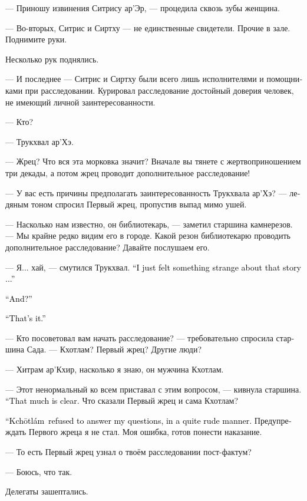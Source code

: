 \documentclass[a4paper,12pt,fleqn]{book}\usepackage{cooltooltips}\usepackage{polyglossia}\setdefaultlanguage{russian}\setotherlanguage{english}\defaultfontfeatures{Ligatures=TeX,Mapping=tex-text} \usepackage{xcolor}\definecolor{lightgray}{HTML}{bbbbbb}\color{lightgray}\newcommand{\ml}[3]{\textenglish{\textcolor{black}{#3}}}
\newcommand{\Kchotlam}{Kch\={o}tl\'{a}m}
\begin{document}
--- Приношу извинения Ситрису ар'Эр, --- процедила сквозь зубы женщина.

--- Во-вторых, Ситрис и Сиртху --- не единственные свидетели.
Прочие в зале.
Поднимите руки.

Несколько рук поднялись.

--- И последнее --- Ситрис и Сиртху были всего лишь исполнителями и помощниками при расследовании.
Курировал расследование достойный доверия человек, не имеющий личной заинтересованности.

--- Кто?

--- Трукхвал ар'Хэ.

--- Жрец?
Что вся эта морковка значит?
Вначале вы тянете с жертвоприношением три декады, а потом жрец проводит дополнительное расследование!

--- У вас есть причины предполагать заинтересованность Трукхвала ар'Хэ? --- ледяным тоном спросил Первый жрец, пропустив выпад мимо ушей.

--- Насколько нам известно, он библиотекарь, --- заметил старшина камнерезов.
--- Мы крайне редко видим его в городе.
Какой резон библиотекарю проводить дополнительное расследование?
Давайте послушаем его.

--- Я... хай, --- смутился Трукхвал.
\ml{$0$}
{--- Мне просто показалось, что не вяжется что-то в этой истории...}
{``I just felt something strange about that story ...''}

\ml{$0$}
{--- И всё?}
{``And?''}

\ml{$0$}
{--- Всё.}
{``That's it.''}

--- Кто посоветовал вам начать расследование? --- требовательно спросила старшина Сада.
--- Кхотлам?
Первый жрец?
Другие люди?

--- Хитрам ар'Кхир, насколько я знаю, он мужчина Кхотлам.

--- Этот ненормальный ко всем приставал с этим вопросом, --- кивнула старшина.
\ml{$0$}
{--- В общем, понятно.}
{``That much is clear.}
Что сказали Первый жрец и сама Кхотлам?

\ml{$0$}
{--- Кхотлам отказалась отвечать на мои вопросы, в довольно грубой форме.}
{``\Kchotlam\ refused to answer my questions, in a quite rude manner.}
Предупреждать Первого жреца я не стал.
Моя ошибка, готов понести наказание.

--- То есть Первый жрец узнал о твоём расследовании пост-фактум?

--- Боюсь, что так.

Делегаты зашептались.
\end{document}

